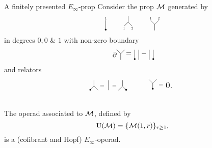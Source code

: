 \begin{frame}{A finitely presented $E_\infty$-prop}
	\pause Consider the prop $\mathcal{M}$ generated by
	\[
	\begin{tikzpicture}[scale=.4]
		\draw (0,.5)--(0,-.75);
		\node[scale=.5] at (0,.75){1};
		\fill (0,-.65) circle (3pt);
	\end{tikzpicture}
	\qquad
	\begin{tikzpicture}[scale=.4]
		\draw (0,0)--(0,.75);
		\draw (0,0)--(.5,-.5);
		\draw (0,0)--(-.5,-.5);
		\node[scale=.5] at (-.5,-.75){1};
		\node[scale=.5] at (.5,-.75){2};
	\end{tikzpicture}
	\qquad
	\begin{tikzpicture}[scale=.4]
		\draw (0,0)--(0,-.75);
		\draw (0,0)--(.5,.5);
		\draw (0,0)--(-.5,.5);
		\node[scale=.5] at (-.5,.75){1};
		\node[scale=.5] at (.5,.75){2};
	\end{tikzpicture}
	\vspace*{-2pt}
	\]
	in degrees $0, 0$ \& $1$ with non-zero boundary
	\[
	\begin{tikzpicture}[scale=.4]
		\node[scale=1] at (-.75,-.1){$\partial$};
		\draw (0,0)--(0,-.75);
		\draw (0,0)--(.5,.5);
		\draw (0,0)--(-.5,.5);
		\node[scale=1] at (1,0){$=$};
	\end{tikzpicture}
	\begin{tikzpicture}[scale=.4]
		\draw (0,.5)--(0,-.75);
		\fill (0,-.65) circle (3pt);
		\draw (.5,.5)--(.5,-.75);
		\node[scale=1] at (1.15,0){$-$};
	\end{tikzpicture}
	\begin{tikzpicture}[scale=.4]
		\draw (0,.5)--(0,-.75);
		\fill (.5,-.65) circle (3pt);
		\draw (.5,.5)--(.5,-.75);
	\end{tikzpicture}
	\]
	\vskip-5pt
	and relators
	\[
	\begin{tikzpicture}[scale=.4]
		\draw (0,0)--(0,.75);
		\draw (0,0)--(.5,-.5);
		\draw (0,0)--(-.5,-.5);
		\fill (-.45,-.45) circle (3pt);
		\node[scale=.8] at (1,0){$=$};
		\draw (1.75,.75)--(1.75,-.5);
		\node[scale=.8] at (2.5,0){$=$};
		\draw (3.5,0)--(3.5,.75);
		\draw (3.5,0)--(4,-.5);
		\draw (3.5,0)--(3,-.5);
		\fill (3.95,-.45) circle (3pt);
	\end{tikzpicture}
	\quad\qquad
	\begin{tikzpicture}[scale=.4]
		\draw (0,0)--(0,-.75);
		\draw (0,0)--(.5,.5);
		\draw (0,0)--(-.5,.5);
		\fill (0,-.7) circle (3pt);
		\node[scale=.8] at (1,-.25){$=$};
		\node[scale=1.2] at (2,-.25){$0.$};
	\end{tikzpicture}
	\]

	\medskip\pause
	 \\
	The operad associated to $\operatorname{\mathcal{M}}$, defined by
	\[
	\operatorname{U}(\mathcal{M}) = \{\mathcal{M}(1,r)\}_{r \geq 1},
	\]
	is a (cofibrant and Hopf) $E_\infty$-operad.
\end{frame}